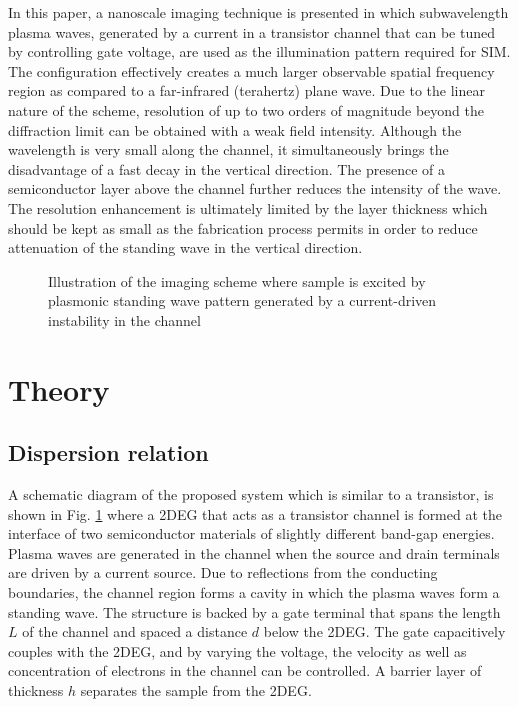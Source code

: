 In this paper, a nanoscale imaging technique is presented in which subwavelength plasma waves, generated by a current in a transistor channel that can be tuned by controlling gate voltage, are used as the illumination pattern required for SIM. The configuration effectively creates a much larger observable spatial frequency region as compared to a far-infrared (terahertz) plane wave. Due to the linear nature of the scheme, resolution of up to two orders of magnitude beyond the diffraction limit can be obtained with a weak field intensity. Although the wavelength is very small along the channel, it simultaneously brings the disadvantage of a fast decay in the vertical direction. The presence of a semiconductor layer above the channel further reduces the intensity of the wave. The resolution enhancement is ultimately limited by the layer thickness which should be kept as small as the fabrication process permits in order to reduce attenuation of the standing wave in the vertical direction.

%
\begin{figure}[t!]
  \centering
  \def\svgwidth{1\linewidth}
  
  \caption{Illustration of the imaging scheme where sample is excited by plasmonic standing wave pattern generated by a current-driven instability in the channel}
  \label{fig:struct}
\end{figure}
%
\section{Theory}
\subsection{Dispersion relation}
%
A schematic diagram of the proposed system which is similar to a transistor, is shown in Fig. \ref{fig:struct} where a 2DEG that acts as a transistor channel is formed at the interface of two semiconductor materials of slightly different band-gap energies. Plasma waves are generated in the channel when the source and drain terminals are driven by a current source. Due to reflections from the conducting boundaries, the channel region forms a cavity in which the plasma waves form a standing wave. The structure is backed by a gate terminal that spans the length $L$ of the channel and spaced a distance $d$ below the 2DEG. The gate capacitively couples with the 2DEG, and by varying the voltage, the velocity as well as concentration of electrons in the channel can be controlled. A barrier layer of thickness $h$ separates the sample from the 2DEG.


